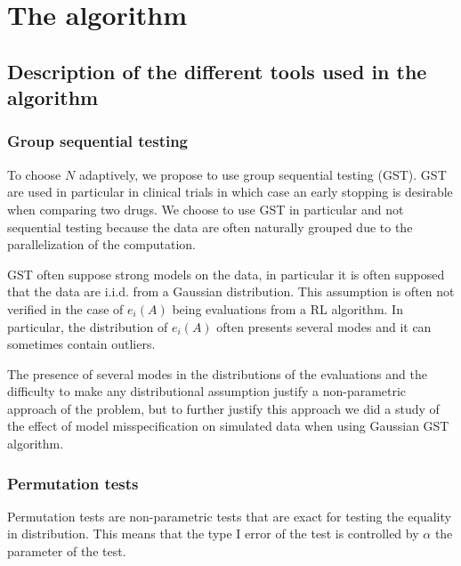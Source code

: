 \documentclass{article}
\theoremstyle{plain}
\theoremstyle{remark}
\newcommand{\1}{\mathbbm{1}}
\numberwithin{equation}{section}
\begin{document}


\section{The algorithm}

\subsection{Description of the different tools used in the algorithm}
\subsubsection{Group sequential testing}

To choose $N$ adaptively, we propose to use group sequential testing (GST). GST are used in particular in clinical trials in which case an early stopping is desirable when comparing two drugs. We choose to use GST in particular and not sequential testing because the data are often naturally grouped due to the parallelization of the computation.

GST often suppose strong models on the data, in particular it is often supposed that the data are i.i.d. from a Gaussian distribution. This assumption is often not verified in the case of $e_i(A)$ being evaluations from a RL algorithm. In particular, the distribution of $e_i(A)$ often presents several modes and it can sometimes contain outliers.

The presence of several modes in the distributions of the evaluations and the difficulty to make any distributional assumption justify a non-parametric approach of the problem, but to further justify this approach we did a study of the effect of model misspecification on simulated data when using Gaussian GST algorithm.


 

\subsubsection{Permutation tests}
Permutation tests are non-parametric tests that are exact for testing the equality in distribution. This means that the type I error of the test is controlled by $\alpha$ the parameter of the test.
\end{document}
